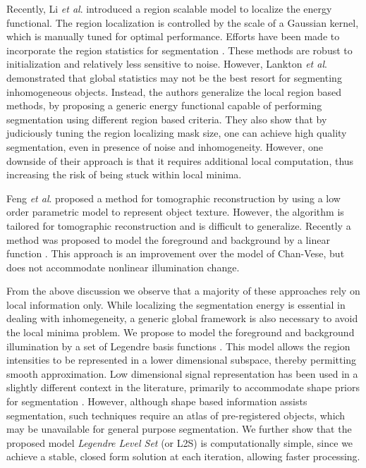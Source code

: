 Recently, Li \textit{et al}. \cite{li_region_scalable} introduced a region scalable model to localize the energy functional. The region localization is controlled by the scale of a Gaussian kernel, which is manually tuned for optimal performance. Efforts have been made to incorporate the region statistics for segmentation \cite{kim_nonparametric,cremers2007review}. These methods are robust to initialization and relatively less sensitive to noise. However, Lankton \textit{et al}.\cite{lankton_localCV} demonstrated that global statistics may not be the best resort for segmenting inhomogeneous objects. Instead, the authors generalize the local region based methods, by proposing a generic energy functional capable of performing segmentation using different region based criteria. 
They also show that by judiciously tuning the region localizing mask size, one can achieve high quality segmentation, even in presence of noise and inhomogeneity. 
However, one downside of their approach is that it requires additional local computation, thus increasing the risk of being stuck within local minima. 


Feng \textit{et al}.  \cite{feng2000tomographic} proposed a method for tomographic reconstruction by using a low order parametric model to represent object texture. However, the algorithm is tailored for tomographic reconstruction and is difficult to generalize. Recently a method was proposed to model the foreground and background by a linear function \cite{du_linear_approx}. This approach is an improvement over the model of Chan-Vese, but does not accommodate nonlinear illumination change.  

From the above discussion we observe that a majority of these approaches rely on local information only. While localizing the segmentation energy is essential in dealing with inhomegeneity, a generic global framework is also necessary to avoid the local minima problem. We propose to model the foreground and background illumination by a set of Legendre basis functions \cite{mukherjee_L2S}. This model allows the region intensities to be represented in a lower dimensional subspace, thereby permitting smooth approximation. Low dimensional signal representation has been used in a slightly different context in the literature, primarily to accommodate shape priors for segmentation \cite{fritscher20073d,huang2008metamorphs}.  However, although shape based information assists segmentation, such techniques require an atlas of pre-registered objects, which may be unavailable for general purpose segmentation. 
We further show that the proposed model \textit{Legendre Level Set} (or L2S) is computationally simple, since we achieve a stable, closed form solution at each iteration, allowing faster processing.

